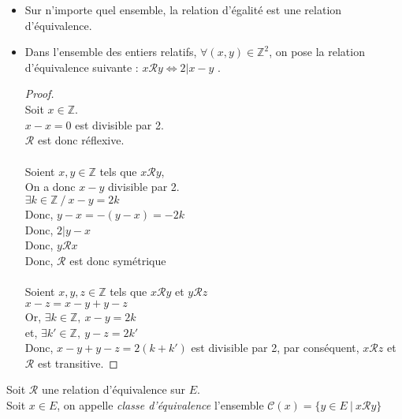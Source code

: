 \documentclass[../main.tex]{subfile}
\begin{document}
\begin{ex}
	$\phantom{a}$\\
	\begin{itemize}
		\item Sur n'importe quel ensemble, la relation d'égalité est une relation d'équivalence.
		\item Dans l'ensemble des entiers relatifs, $\forall (x, y) \in \mathbb{Z}^2$, on pose la relation d'équivalence suivante : $x \mathcal{R} y \Leftrightarrow 2 | x - y $ .
		\begin{proof}
			$\phantom{a}$\\

			Soit $x \in \mathbb{Z}$.\\
			$x-x = 0$ est divisible par 2.\\
			$\mathcal{R}$ est donc réflexive.
			$$\phantom{a}$$

			Soient $x, y \in \mathbb{Z}$ tels que $x \mathcal{R} y$,\\
			On a donc $x - y$ divisible par 2.\\
			$\exists k \in \mathbb{Z} \ / \ x -y = 2 k$\\
			Donc, $y -x = -(y-x) = -2k$\\
			Donc, $2|y-x$\\
			Donc, $y \mathcal{R} x$\\
			Donc, $\mathcal{R}$ est donc symétrique\\
			$$\phantom{a}$$

			Soient $x, y, z \in \mathbb{Z}$ tels que $x \mathcal{R} y$ et $y \mathcal{R} z$\\
			$x - z = x-y + y-z$\\
			Or, $\exists k \in \mathbb{Z}, \ x - y = 2k$\\
			et, $\exists k' \in \mathbb{Z}, \ y - z = 2k'$\\
			Donc, $x-y+y-z = 2(k+k')$ est divisible par 2, par conséquent, $x \mathcal{R} z$ et $\mathcal{R}$ est transitive.
		\end{proof}
	\end{itemize}
\end{ex}

\begin{defi}
	Soit $\mathcal{R}$ une relation d'équivalence sur $E$.\\
	Soit $x \in E$, on appelle \emph{classe d'équivalence} l'ensemble $\mathcal{C}(x) = \{ y \in E \ | \ x \mathcal{R} y \}$
\end{defi}
\end{document}
